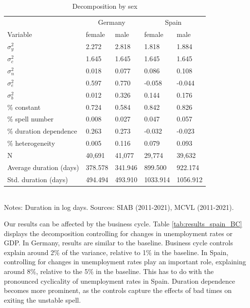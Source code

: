 \documentclass[12pt]{article}
\theoremstyle{definition}
\theoremstyle{remark}
\begin{document}
   
\begin{table}[htbb!]
    \centering
    \caption{Decomposition by sex}
\begin{tabular}{lllll}
\toprule
 & \multicolumn{2}{c|}{Germany} & \multicolumn{2}{c}{Spain} \\[5pt]
Variable & female & male & female & male \\
\midrule
$\sigma^{2}_y$ & 2.272 & 2.818 & 1.818 & 1.884 \\
$\sigma^{2}_c$ & 1.645 & 1.645 & 1.645 & 1.645 \\
$\sigma^{2}_n$ & 0.018 & 0.077 & 0.086 & 0.108 \\
$\sigma^{2}_e$ & 0.597 & 0.770 & -0.058 & -0.044 \\
$\sigma^{2}_b$ & 0.012 & 0.326 & 0.144 & 0.176 \\
\midrule
\% constant & 0.724 & 0.584 & 0.842 & 0.826 \\
\% spell number & 0.008 & 0.027 & 0.047 & 0.057 \\
\% duration dependence & 0.263 & 0.273 & -0.032 & -0.023 \\
\% heterogeneity & 0.005 & 0.116 & 0.079 & 0.093 \\
\hline \hline
N & 40,691 & 41,077 & 29,774 & 39,632 \\
Average duration (days) & 378.578 & 341.946 & 899.500 & 922.174 \\
Std. duration (days) & 494.494 & 493.910 & 1033.914 & 1056.912 \\
\bottomrule
\end{tabular}
\label{decomp_sex}
\smallskip
\footnotesize \\
Notes: Duration in log days. Sources: SIAB  (2011-2021), MCVL (2011-2021).
\end{table}
    
Our results can be affected by the business cycle. Table \ref{tab:results_spain_BC} displays the decomposition controlling for changes in unemployment rates or GDP.
In Germany, results are similar to the baseline. Business cycle controls explain around 2\% of the variance, relative to 1\% in the baseline. In Spain, 
controlling for changes in unemployment rates 
play an important role, explaining around 8\%, relative to the 5\% in the baseline. This has to do with the pronounced cyclicality of unemployment rates in Spain.
Duration dependence becomes more prominent, as the controls capture
the effects of bad times on exiting the unstable spell.
\end{document}
